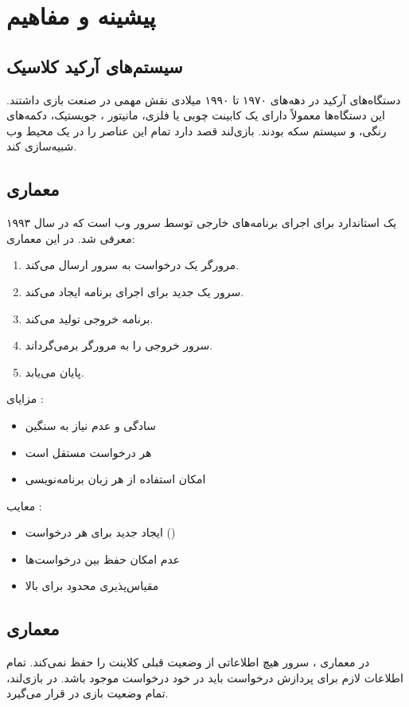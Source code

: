 \documentclass[12pt,a4paper]{article}
\begin{document}
	\section{پیشینه و مفاهیم}
	
	\subsection{سیستم‌های آرکید کلاسیک}
	دستگاه‌های آرکید در دهه‌های ۱۹۷۰ تا ۱۹۹۰ میلادی نقش مهمی در صنعت بازی داشتند.
	این دستگاه‌ها معمولاً دارای یک کابینت چوبی یا فلزی، مانیتور ، جویستیک، دکمه‌های رنگی، و سیستم سکه بودند.
	بازی‌لند قصد دارد تمام این عناصر را در یک محیط وب شبیه‌سازی کند.
	
	\subsection{معماری }
	 یک استاندارد برای اجرای برنامه‌های خارجی توسط سرور وب است که در سال ۱۹۹۳ معرفی شد.
	در این معماری:
	
	\begin{enumerate}
		\item مرورگر یک درخواست  به سرور ارسال می‌کند.
		\item سرور یک  جدید برای اجرای برنامه  ایجاد می‌کند.
		\item برنامه  خروجی  تولید می‌کند.
		\item سرور خروجی را به مرورگر برمی‌گرداند.
		\item {} پایان می‌یابد.
	\end{enumerate}
	
	مزایای :
	\begin{itemize}
		\item سادگی و عدم نیاز به  سنگین
		\item هر درخواست مستقل است
		\item امکان استفاده از هر زبان برنامه‌نویسی
	\end{itemize}
	
	معایب :
	\begin{itemize}
		\item ایجاد  جدید برای هر درخواست ()
		\item عدم امکان حفظ  بین درخواست‌ها
		\item مقیاس‌پذیری محدود برای  بالا
	\end{itemize}
	
	\subsection{معماری }
	در معماری ، سرور هیچ اطلاعاتی از وضعیت قبلی کلاینت را حفظ نمی‌کند.
	تمام اطلاعات لازم برای پردازش درخواست باید در خود درخواست موجود باشد.
	در بازی‌لند، تمام وضعیت بازی در  قرار می‌گیرد.
	
\end{document}

